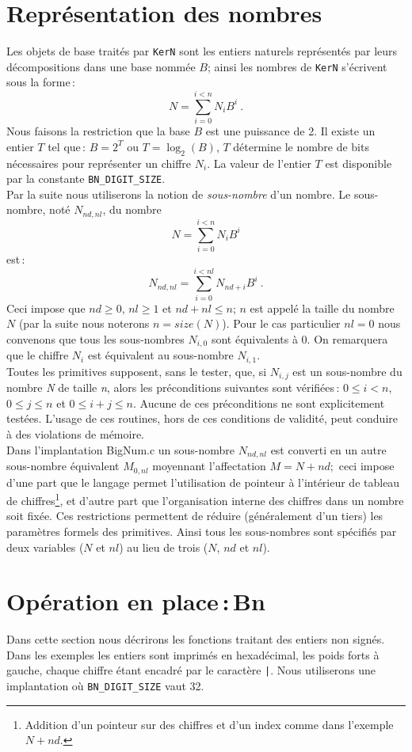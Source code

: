 \section{Repr\'esentation des nombres}
Les objets de base trait\'es par \verb+KerN+ sont les entiers naturels
repr\'esent\'es par leurs d\'ecompositions dans une base nomm\'ee $B$; ainsi les
nombres de \verb+KerN+ s'\'ecrivent sous la forme\,:
\[ N = \sum_{i=0}^{i<n} N_i B^i\ .\]
Nous faisons la restriction que la base $B$ est une puissance de 2. Il
existe un entier $T$ tel que\,: $B = 2^T$ ou $T = \log_2(B)$, $T$
d\'etermine le nombre de bits n\'ecessaires pour repr\'esenter un chiffre $N_i$.
La valeur de l'entier $T$ est disponible par la constante
\verb+BN_DIGIT_SIZE+.
\\[12pt]
Par la suite nous utiliserons la notion de {\em sous-nombre} d'un nombre.
Le sous-nombre, not\'e $N_{nd,nl}$, du nombre 
\[ N = \sum_{i=0}^{i<n} N_i B^i \]
est\,:
\[ N_{nd,nl} = \sum_{i=0}^{i<nl}N_{nd+i} B^i\ .\]
Ceci impose que $nd \geq 0$, $nl \geq 1$ et $nd + nl \leq n$;
$n$ est appel\'e la taille du nombre $N$ (par la suite nous noterons
$n = size(N)$). Pour le cas particulier $nl = 0$ nous convenons que tous
les sous-nombres $N_{i,0}$ sont \'equivalents \`a 0.
On remarquera que le chiffre $N_i$ est \'equivalent au sous-nombre
$N_{i,1}$.
\\
Toutes les primitives supposent, sans le tester, que, si $N_{i,j}$ est
un sous-nombre du nombre {\em N} de taille {\em n}, alors les
pr\'econditions suivantes sont v\'erifi\'ees\,: $0 \leq i < n$,
$0 \leq j \leq n$ et $0 \leq i+j \leq n$.
Aucune de ces pr\'econditions ne sont
explicitement test\'ees. L'usage de ces routines, hors de ces conditions
de validit\'e, peut conduire \`a des violations de m\'emoire.
\\
Dans l'implantation BigNum.c un sous-nombre $N_{nd,nl}$ est converti en
un autre sous-nombre \'equivalent $M_{0,nl}$ moyennant l'affectation
$M = N + nd;$ ceci impose d'une part que le langage permet l'utilisation
de pointeur \`a l'int\'erieur de tableau de chiffres\footnote{Addition d'un
pointeur sur des chiffres et d'un index comme dans l'exemple $N + nd$.}, et
d'autre part que l'organisation interne des chiffres dans un nombre soit
fix\'ee. Ces restrictions permettent de r\'eduire (g\'en\'eralement d'un tiers)
les param\`etres formels des primitives. Ainsi tous les sous-nombres sont
sp\'ecifi\'es par deux variables ($N$ et $nl$) au lieu de trois ($N$, $nd$ et
$nl$).

\section{Op\'eration en place\,:\,Bn}
Dans cette section nous d\'ecrirons les fonctions traitant des entiers non
sign\'es. Dans les exemples les entiers sont imprim\'es en hexad\'ecimal,
les poids forts \`a gauche, chaque chiffre \'etant encadr\'e par le caract\`ere
\verb+|+. Nous utiliserons une implantation o\`u \verb+BN_DIGIT_SIZE+ vaut
32.

